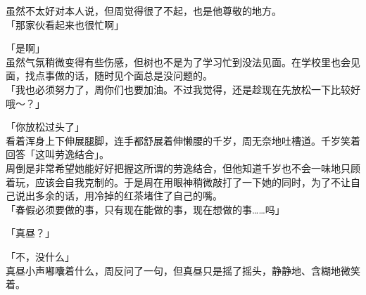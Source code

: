 虽然不太好对本人说，但周觉得很了不起，也是他尊敬的地方。\\

「那家伙看起来也很忙啊」

「是啊」\\

虽然气氛稍微变得有些伤感，但树也不是为了学习忙到没法见面。在学校里也会见面，找点事做的话，随时见个面总是没问题的。\\

「我也必须努力了，周你们也要加油。不过我觉得，还是趁现在先放松一下比较好哦～？」

「你放松过头了」\\

看着浑身上下伸展腿脚，连手都舒展着伸懒腰的千岁，周无奈地吐槽道。千岁笑着回答「这叫劳逸结合」。\\

周倒是非常希望她能好好把握这所谓的劳逸结合，但他知道千岁也不会一味地只顾着玩，应该会自我克制的。于是周在用眼神稍微敲打了一下她的同时，为了不让自己说出多余的话，用冷掉的红茶堵住了自己的嘴。\\

「春假必须要做的事，只有现在能做的事，现在想做的事……吗」

「真昼？」

「不，没什么」\\

真昼小声嘟囔着什么，周反问了一句，但真昼只是摇了摇头，静静地、含糊地微笑着。

